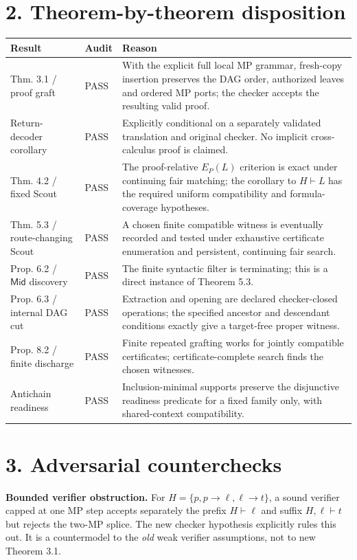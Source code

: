 \documentclass[11pt,letterpaper]{article}
\begin{document}
\section*{2. Theorem-by-theorem disposition}
\small
\renewcommand{\arraystretch}{1.26}
\begin{tabularx}{\linewidth}{@{}p{.27\linewidth}p{.13\linewidth}X@{}}
\toprule
\textbf{Result} & \textbf{Audit} & \textbf{Reason}\\\midrule
Thm. 3.1 / proof graft & PASS & With the explicit full local MP grammar, fresh-copy insertion preserves the DAG order, authorized leaves and ordered MP ports; the checker accepts the resulting valid proof.\\
Return-decoder corollary & PASS & Explicitly conditional on a separately validated translation and original checker. No implicit cross-calculus proof is claimed.\\
Thm. 4.2 / fixed Scout & PASS & The proof-relative $E_P(L)$ criterion is exact under continuing fair matching; the corollary to $H\vdash L$ has the required uniform compatibility and formula-coverage hypotheses.\\
Thm. 5.3 / route-changing Scout & PASS & A chosen finite compatible witness is eventually recorded and tested under exhaustive certificate enumeration and persistent, continuing fair search.\\
Prop. 6.2 / $\mathsf{Mid}$ discovery & PASS & The finite syntactic filter is terminating; this is a direct instance of Theorem 5.3.\\
Prop. 6.3 / internal DAG cut & PASS & Extraction and opening are declared checker-closed operations; the specified ancestor and descendant conditions exactly give a target-free proper witness.\\
Prop. 8.2 / finite discharge & PASS & Finite repeated grafting works for jointly compatible certificates; certificate-complete search finds the chosen witnesses.\\
Antichain readiness & PASS & Inclusion-minimal supports preserve the disjunctive readiness predicate for a fixed family only, with shared-context compatibility.\\
\bottomrule
\end{tabularx}
\normalsize\renewcommand{\arraystretch}{1}
\section*{3. Adversarial counterchecks}
\textbf{Bounded verifier obstruction.} For $H=\{p,p\to\ell,\ell\to t\}$, a sound verifier capped at one MP step accepts separately the prefix $H\vdash\ell$ and suffix $H,\ell\vdash t$ but rejects the two-MP splice. The new checker hypothesis explicitly rules this out. It is a countermodel to the \emph{old} weak verifier assumptions, not to new Theorem 3.1.
\end{document}
